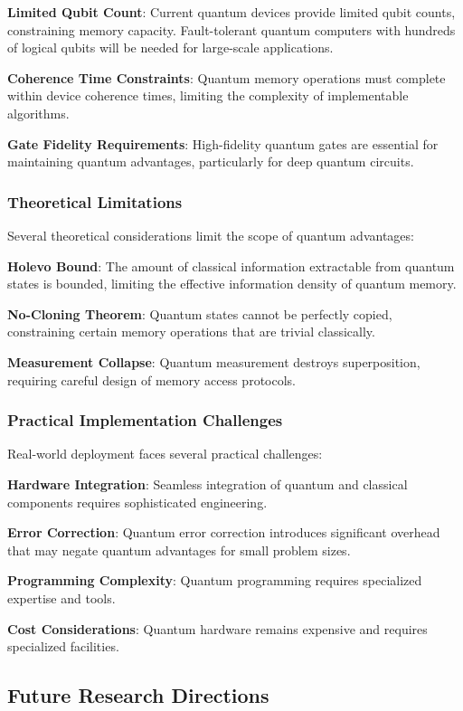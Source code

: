\textbf{Limited Qubit Count}: Current quantum devices provide limited qubit counts, constraining memory capacity. Fault-tolerant quantum computers with hundreds of logical qubits will be needed for large-scale applications.

\textbf{Coherence Time Constraints}: Quantum memory operations must complete within device coherence times, limiting the complexity of implementable algorithms.

\textbf{Gate Fidelity Requirements}: High-fidelity quantum gates are essential for maintaining quantum advantages, particularly for deep quantum circuits.

\subsubsection{Theoretical Limitations}

Several theoretical considerations limit the scope of quantum advantages:

\textbf{Holevo Bound}: The amount of classical information extractable from quantum states is bounded, limiting the effective information density of quantum memory.

\textbf{No-Cloning Theorem}: Quantum states cannot be perfectly copied, constraining certain memory operations that are trivial classically.

\textbf{Measurement Collapse}: Quantum measurement destroys superposition, requiring careful design of memory access protocols.

\subsubsection{Practical Implementation Challenges}

Real-world deployment faces several practical challenges:

\textbf{Hardware Integration}: Seamless integration of quantum and classical components requires sophisticated engineering.

\textbf{Error Correction}: Quantum error correction introduces significant overhead that may negate quantum advantages for small problem sizes.

\textbf{Programming Complexity}: Quantum programming requires specialized expertise and tools.

\textbf{Cost Considerations}: Quantum hardware remains expensive and requires specialized facilities.

\subsection{Future Research Directions}

